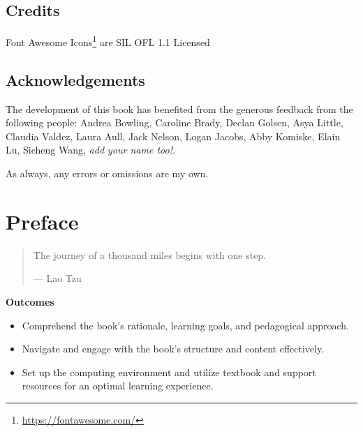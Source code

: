 \documentclass[
  letterpaper,
]{latex/krantz}
\providecommand{\tightlist}{%
  \setlength{\itemsep}{0pt}\setlength{\parskip}{0pt}}\usepackage{longtable,booktabs,array}
\theoremstyle{definition}
\theoremstyle{remark}
\DeclareRobustCommand{\href}[2]{#2\footnote{\url{#1}}}
\begin{document}
\section*{Credits}\label{credits}


\href{https://fontawesome.com/}{Font Awesome Icons} are SIL OFL 1.1
Licensed

\section*{Acknowledgements}\label{acknowledgements}


The development of this book has benefited from the generous feedback
from the following people: Andrea Bowling, Caroline Brady, Declan
Golsen, Asya Little, Claudia Valdez, Laura Aull, Jack Nelson, Logan
Jacobs, Abby Komiske, Elain Lu, Sicheng Wang, \emph{add your name too!}.

As always, any errors or omissions are my own.


\chapter*{Preface}\label{sec-preface}


\begin{quote}
The journey of a thousand miles begins with one step.

--- Lao Tzu
\end{quote}

\begin{tcolorbox}[enhanced jigsaw, colback=white, opacityback=0, bottomrule=.15mm, rightrule=.15mm, breakable, left=2mm, arc=.35mm, colframe=quarto-callout-color-frame, leftrule=.75mm, toprule=.15mm]

\textbf{ Outcomes}

\begin{itemize}
\tightlist
\item
  Comprehend the book's rationale, learning goals, and pedagogical
  approach.
\item
  Navigate and engage with the book's structure and content effectively.
\item
  Set up the computing environment and utilize textbook and support
  resources for an optimal learning experience.
\end{itemize}

\end{tcolorbox}
\end{document}
